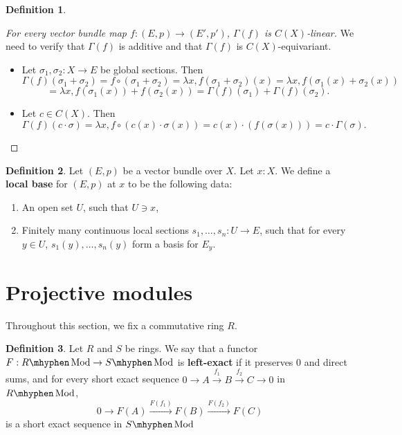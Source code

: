\documentclass[11pt]{article}
\newcommand{\Mod}{\mhyphen\operatorname{Mod}}
\theoremstyle{plain}
\theoremstyle{definition}
\newtheorem{definition}{Definition}[section]
\begin{document}
\begin{definition}
    \begin{proof}[For every vector bundle map \(f : (E,p) \to (E',p')\), \(\Gamma(f)\) is \(C(X)\)-linear]
      We need to verify that \(\Gamma(f)\) is additive and that \(\Gamma(f)\) is \(C(X)\)-equivariant.
      \begin{itemize}
      \item Let \(\sigma_1, \sigma_2 : X \to E\) be global sections. Then
        \[\Gamma(f)(\sigma_1 + \sigma_2) = f \circ (\sigma_1 + \sigma_2) = \lambda x, f(\sigma_1 + \sigma_2)(x) = \lambda x, f(\sigma_1(x) + \sigma_2(x))\]\[ = \lambda x, f(\sigma_1(x)) + f(\sigma_2(x)) = \Gamma(f)(\sigma_1) + \Gamma(f)(\sigma_2).\]
        \item Let \(c \in C(X)\). Then \[\Gamma(f)(c \cdot \sigma) = \lambda x, f \circ (c(x) \cdot \sigma(x)) = c(x) \cdot (f(\sigma(x))) = c \cdot \Gamma(\sigma).\]
      \end{itemize}
    \end{proof}
  
\end{definition}

\begin{definition}\label{def-local-base}
  Let \((E,p)\) be a vector bundle over \(X\). Let \(x : X\). We define a \textbf{local base} for \((E,p)\) at \(x\) to be the following data:
  \begin{enumerate}[label={(\alph*)}]
  \item An open set \(U\), such that \(U \ni x\),
  \item Finitely many continuous local sections \(s_1, \dots, s_n : U \to E\), such that for every \(y \in U\), \(s_1(y), \dots, s_n(y)\) form a basis for \(E_y\).
  \end{enumerate}
\end{definition}

\section{Projective modules}
Throughout this section, we fix a commutative ring \(R\).

\begin{definition} \label{def-left-exact}
  Let \(R\) and \(S\) be rings. We say that a functor \(F : R\Mod \to S\Mod\) is \textbf{left-exact} if it preserves \(0\) and direct sums, and for every short exact sequence \(0 \to A \overset{f_1}{\to} B \overset{f_2}{\to} C \to 0\) in \(R\Mod\),
  \[0 \to F(A) \overset{F(f_1)}{\to} F(B) \overset{F(f_2)}{\to} F(C)\]
  is a short exact sequence in \(S\Mod\)
\end{definition}
\end{document}
